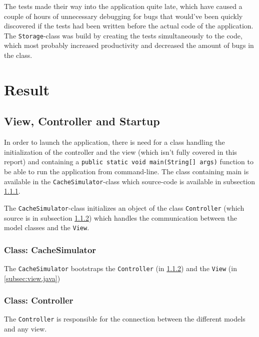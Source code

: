 \documentclass[a4paper]{scrreprt}
\begin{document}
The tests made their way into the application quite late, which have caused a couple of hours of unnecessary debugging for bugs that would've been quickly discovered if the tests had been written before the actual code of the application. The \texttt{Storage}-class was build by creating the tests simultaneously to the code, which most probably increased productivity and decreased the amount of bugs in the class.

\chapter{Result}
\label{sec:result}

\section{View, Controller and Startup}
\label{sec:sup}

In order to launch the application, there is need for a class handling the initialization of the controller and the view (which isn't fully covered in this report) and containing a \texttt{public static void main(String[] args)} function to be able to run the application from command-line. The class containing main is available in the \texttt{CacheSimulator}-class which source-code is available in subsection \ref{subsec:cachesimulator.java}.

The \texttt{CacheSimulator}-class initializes an object of the class \texttt{Controller} (which source is in subsection \ref{subsec:controller.java}) which handles the communication between the model classes and the \texttt{View}.


\subsection{Class: CacheSimulator}
\label{subsec:cachesimulator.java}

The \texttt{CacheSimulator} bootstraps the \texttt{Controller} (in \ref{subsec:controller.java}) and the \texttt{View} (in \ref{subsec:view.java})



\subsection{Class: Controller}
\label{subsec:controller.java}

The \texttt{Controller} is responsible for the connection between the different models and any view.
\end{document}
